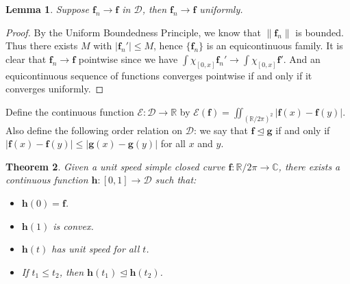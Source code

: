 \documentclass{amsart}
\newcommand{\C}			{\mathbb C}
\newcommand{\R}			{\mathbb R}
\newcommand{\f}			{\mathbf f}
\newcommand{\g}			{\mathbf g}
\newcommand{\h}			{\mathbf h}
\newcommand{\map}		{\longrightarrow}
\newtheorem{theorem}{Theorem}[section]
\newtheorem{lemma}[theorem]{Lemma}
\numberwithin{equation}{section}
\begin{document}
\begin{lemma}\label{unif}
Suppose $\f_n\to\f$ in $\mathcal D$, then $\f_n\to\f$ uniformly.
\end{lemma}

\begin{proof}
By the Uniform Boundedness Principle, we know that 
$\|\f_n\|$ is bounded.  Thus there exists $M$ 
with $|\f_n'|\leq M$, hence $\{\f_n\}$ is an equicontinuous family.  
It is clear that $\f_n\to\f$ pointwise since we have 
$\int\chi_{[0,x]}\f_n'\to\int\chi_{[0,x]}\f'$.  And 
an equicontinuous sequence of functions converges 
pointwise if and only if it converges uniformly.
\end{proof}

Define the continuous function $\mathcal E:\mathcal D\map\R$ by 
$\mathcal E(\f)=\iint_{(\R/2\pi)^2}|\f(x)-\f(y)|$.  Also define the following 
order relation on $\mathcal D$: we say that $\f\trianglelefteq\g$ 
if and only if $|\f(x)-\f(y)|\leq|\g(x)-\g(y)|$ 
for all $x$ and $y$.

\begin{theorem}\label{main}
Given a unit speed simple closed curve $\f:\R/2\pi\map\C$, 
there exists a continuous function $\h:[0,1]\map\mathcal D$ such 
that:
\begin{itemize}
\item[(1)] $\h(0)=\f$.
\item[(2)] $\h(1)$ is convex.
\item[(3)] $\h(t)$ has unit speed for all $t$.
\item[(4)] If $t_1\leq t_2$, then $\h(t_1)\trianglelefteq\h(t_2)$.
\end{itemize}
\end{theorem}
\end{document}
